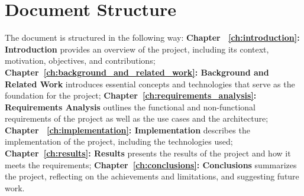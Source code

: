 \section{Document Structure}
\label{sec:document_structure}

The document is structured in the following way: \textbf{Chapter
    ~\ref{ch:introduction}: Introduction} provides an overview of the project,
including its context, motivation, objectives, and contributions;
\textbf{Chapter~\ref{ch:background_and_related_work}: Background and Related
    Work} introduces essential concepts and technologies that serve as the
foundation for the project; \textbf{Chapter~\ref{ch:requirements_analysis}:
    Requirements Analysis} outlines the functional and non-functional requirements
of the project as well as the use cases and the architecture; \textbf{Chapter
    ~\ref{ch:implementation}: Implementation} describes the implementation of the
project, including the technologies used; \textbf{Chapter~\ref{ch:results}:
    Results} presents the results of the project and how it meets the requirements;
\textbf{Chapter~\ref{ch:conclusions}: Conclusions} summarizes the project,
reflecting on the achievements and limitations, and suggesting future work.
